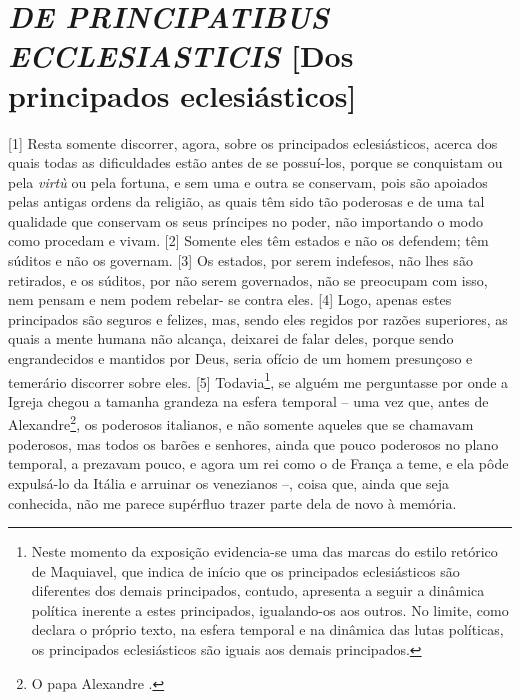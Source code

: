 \quebra\section{\emph{DE PRINCIPATIBUS ECCLESIASTICIS}\break
{[}Dos principados eclesiásticos{]}}

{[}1{]} Resta somente discorrer, agora, sobre os principados
eclesiásticos, acerca dos quais todas as dificuldades estão antes de se
possuí-los, porque se conquistam ou pela \emph{virtù} ou pela fortuna, e
sem uma e outra se conservam, pois são apoiados pelas antigas ordens da
religião, as quais têm sido tão poderosas e de uma tal qualidade que
conservam os seus príncipes no poder, não importando o modo como
procedam e vivam. {[}2{]} Somente eles têm estados e não os defendem;
têm súditos e não os governam. {[}3{]} Os estados, por serem indefesos,
não lhes são retirados, e os súditos, por não serem governados, não se
preocupam com isso, nem pensam e nem podem rebelar- se contra eles.
{[}4{]} Logo, apenas estes principados são seguros e felizes, mas, sendo
eles regidos por razões superiores, as quais a mente humana não alcança,
deixarei de falar deles, porque sendo engrandecidos e mantidos por Deus,
seria ofício de um homem presunçoso e temerário discorrer sobre eles.
{[}5{]} Todavia\footnote{Neste momento da exposição evidencia-se uma das
  marcas do estilo retórico de Maquiavel, que indica de início que os
  principados eclesiásticos são diferentes dos demais principados,
  contudo, apresenta a seguir a dinâmica política inerente a estes
  principados, igualando-os aos outros. No limite, como declara o
  próprio texto, na esfera temporal e na dinâmica das lutas políticas,
  os principados eclesiásticos são iguais aos demais principados.}, se
alguém me perguntasse por onde a Igreja chegou a tamanha grandeza na
esfera temporal -- uma vez que, antes de Alexandre\footnote{O papa
  Alexandre .}, os poderosos italianos, e não somente aqueles que se
chamavam poderosos, mas todos os barões e senhores, ainda que pouco
poderosos no plano temporal, a prezavam pouco, e agora um rei como o de
França a teme, e ela pôde expulsá-lo da Itália e arruinar os venezianos
--, coisa que, ainda que seja conhecida, não me parece supérfluo trazer
parte dela de novo à memória.

